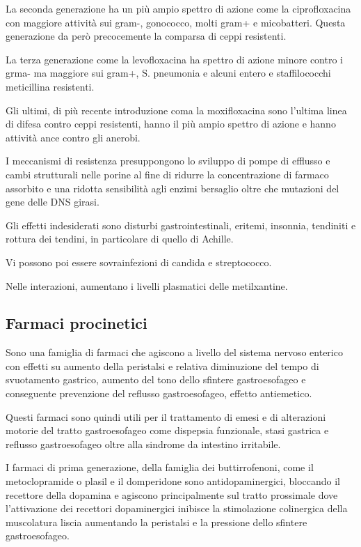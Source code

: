 La seconda generazione ha un più ampio spettro di azione come la ciprofloxacina con maggiore attività sui gram-, gonococco, molti gram+ e micobatteri. Questa generazione da però precocemente la comparsa di ceppi resistenti.

La terza generazione come la levofloxacina ha spettro di azione minore contro i grma- ma maggiore sui gram+, S. pneumonia e alcuni entero e staffilococchi meticillina resistenti.

Gli ultimi, di più recente introduzione coma la moxifloxacina sono l'ultima linea di difesa contro ceppi resistenti, hanno il più ampio spettro di azione e hanno attività ance contro gli anerobi.

I meccanismi di resistenza presuppongono lo sviluppo di pompe di efflusso e cambi strutturali nelle porine al fine di ridurre la concentrazione di farmaco assorbito e una ridotta sensibilità agli enzimi bersaglio oltre che mutazioni del gene delle DNS girasi.

Gli effetti indesiderati sono disturbi gastrointestinali, eritemi, insonnia, tendiniti e rottura dei tendini, in particolare di quello di Achille. 

Vi possono poi essere sovrainfezioni di candida e streptococco.

Nelle interazioni, aumentano i livelli plasmatici delle metilxantine.

\subsection{Farmaci procinetici}

Sono una famiglia di farmaci che agiscono a livello del sistema nervoso enterico con effetti su aumento della peristalsi e relativa diminuzione del tempo di svuotamento gastrico, aumento del tono dello sfintere gastroesofageo e conseguente prevenzione del reflusso gastroesofageo, effetto antiemetico.

Questi farmaci sono quindi utili per il trattamento di emesi e di alterazioni motorie del tratto  gastroesofageo come dispepsia funzionale, stasi gastrica e reflusso gastroesofageo oltre alla sindrome da intestino irritabile.

I farmaci di prima generazione, della famiglia dei buttirrofenoni, come il metoclopramide o plasil e il domperidone sono antidopaminergici, bloccando il recettore  della dopamina e agiscono principalmente sul tratto prossimale dove l'attivazione dei recettori dopaminergici inibisce la stimolazione colinergica della muscolatura liscia aumentando la peristalsi e la pressione dello sfintere gastroesofageo.

